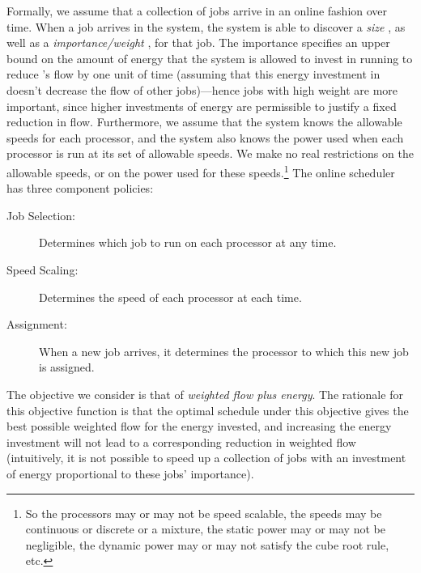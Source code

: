 \documentclass[11pt]{article}
\begin{document}
Formally, we assume that a collection of jobs arrive in an online
fashion over time. When a job  arrives in the system, the system is
able to discover a \emph{size} , as well as a
\emph{importance/weight} , for that job. The
importance  specifies an upper bound on the amount of energy that
the system is allowed to invest in running  to reduce 's flow by
one unit of time (assuming that this energy investment in  doesn't
decrease the flow of other jobs)---hence jobs with high weight are more
important, since higher investments of energy are permissible to justify
a fixed reduction in flow. Furthermore, we assume that the system knows the
allowable speeds for each processor, and the system also knows the
power used when each processor is run at its
set of allowable speeds.  We make no real restrictions on the allowable speeds,
or on the power used for these speeds.\footnote{So the processors may or
  may not be speed scalable, the speeds may be continuous or discrete or
  a mixture, the static power may or may not be negligible, the dynamic
  power may or may not satisfy the cube root rule, etc.}  The online
scheduler has three component policies:
\begin{description}
\item[Job Selection:] Determines which job to run on each processor at any time.
\item[Speed Scaling:]Determines the speed of each processor at each time.
\item[Assignment:] When a new job arrives, it determines the processor
to which this new job is assigned.
\end{description}


The objective we consider is that of \emph{weighted flow plus energy}.
The rationale for this objective function is that the optimal schedule
under this objective gives the best possible weighted flow for the
energy invested, and increasing the energy investment will not lead to a
corresponding reduction in weighted flow (intuitively, it is not
possible to speed up a collection of jobs with an investment of energy
proportional to these jobs' importance).
\end{document}
